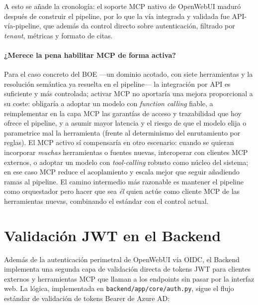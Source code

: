 A esto se añade la cronología: el soporte MCP nativo de OpenWebUI maduró después de construir el pipeline, por lo que la vía integrada y validada fue API-vía-pipeline, que además da control directo sobre autenticación, filtrado por \textit{tenant}, métricas y formato de citas.

\paragraph{¿Merece la pena habilitar MCP de forma activa?} Para el caso concreto del BOE ---un dominio acotado, con siete herramientas y la resolución semántica ya resuelta en el pipeline--- la integración por API es suficiente y más controlada; activar MCP no aportaría una mejora proporcional a su coste: obligaría a adoptar un modelo con \textit{function calling} fiable, a reimplementar en la capa MCP las garantías de acceso y trazabilidad que hoy ofrece el pipeline, y a asumir mayor latencia y el riesgo de que el modelo elija o parametrice mal la herramienta (frente al determinismo del enrutamiento por reglas). El MCP activo sí compensaría en otro escenario: cuando se quieran incorporar \emph{muchas} herramientas o fuentes nuevas, interoperar con clientes MCP externos, o adoptar un modelo con \textit{tool-calling} robusto como núcleo del sistema; en ese caso MCP reduce el acoplamiento y escala mejor que seguir añadiendo ramas al pipeline. El camino intermedio más razonable es mantener el pipeline como orquestador pero hacer que sea \emph{él} quien actúe como cliente MCP de las herramientas nuevas, combinando el estándar con el control actual.

\section{Validación JWT en el Backend}
\label{anexo:jwt}

Además de la autenticación perimetral de OpenWebUI vía OIDC, el Backend implementa una segunda capa de validación directa de tokens JWT para clientes externos y herramientas MCP que llaman a los endpoints sin pasar por la interfaz web. La lógica, implementada en \texttt{backend/app/core/auth.py}, sigue el flujo estándar de validación de tokens Bearer de Azure AD:

